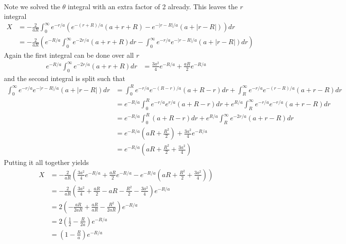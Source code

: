 \documentclass[11pt]{article}
\numberwithin{equation}{section}
\begin{document}
Note we solved the $\theta$ integral with an extra factor of 2 already. This leaves the $r$ integral
\begin{align*}
X &= -\frac{2}{aR}\int_{0}^{\infty}e^{-r/a}\left(e^{-(r+R)/a}(a+r+R) - e^{-|r-R|/a}(a+|r-R|)\right)dr\\
&= -\frac{2}{aR}\left(e^{-R/a}\int_{0}^{\infty}e^{-2r/a}(a+r+R)dr - \int_{0}^{\infty}e^{-r/a}e^{-|r-R|/a}(a+|r-R|)dr\right)
\end{align*}
Again the first integral can be done over all $r$ 
\begin{align*}
e^{-R/a}\int_{0}^{\infty}e^{-2r/a}(a+r+R)dr &= \frac{3a^2}{4}e^{-R/a}+\frac{aR}{2}e^{-R/a}
\end{align*}
and the second integral is split such that
\begin{align*}
\int_{0}^{\infty}e^{-r/a}e^{-|r-R|/a}(a+|r-R|)dr &= \int_{0}^{R}e^{-r/a}e^{-(R-r)/a}(a+R-r)dr + \int_{R}^{\infty}e^{-r/a}e^{-(r-R)/a}(a+r-R)dr\\
&= e^{-R/a}\int_{0}^{R}e^{-r/a}e^{r/a}(a+R-r)dr + e^{R/a}\int_{R}^{\infty}e^{-r/a}e^{-r/a}(a+r-R)dr\\
&= e^{-R/a}\int_{0}^{R}(a+R-r)dr + e^{R/a}\int_{R}^{\infty}e^{-2r/a}(a+r-R)dr\\
&= e^{-R/a}\left(aR+\frac{R^2}{2}\right) + \frac{3a^2}{4}e^{-R/a}\\
&= e^{-R/a}\left(aR+\frac{R^2}{2}+\frac{3a^2}{4}\right)
\end{align*}
Putting it all together yields
\begin{align*}
X &= -\frac{2}{aR}\left(\frac{3a^2}{4}e^{-R/a}+\frac{aR}{2}e^{-R/a} - e^{-R/a}\left(aR+\frac{R^2}{2}+\frac{3a^2}{4}\right)\right)\\
&= -\frac{2}{aR}\left(\frac{3a^2}{4}+\frac{aR}{2} - aR - \frac{R^2}{2} - \frac{3a^2}{4}\right)e^{-R/a}\\
&= 2\left(-\frac{aR}{2aR} + \frac{aR}{aR} - \frac{R^2}{2aR}\right)e^{-R/a}\\
&= 2\left(\frac{1}{2} - \frac{R}{2a}\right)e^{-R/a}\\
&= \left(1 - \frac{R}{a}\right)e^{-R/a}
\end{align*}
\end{document}
